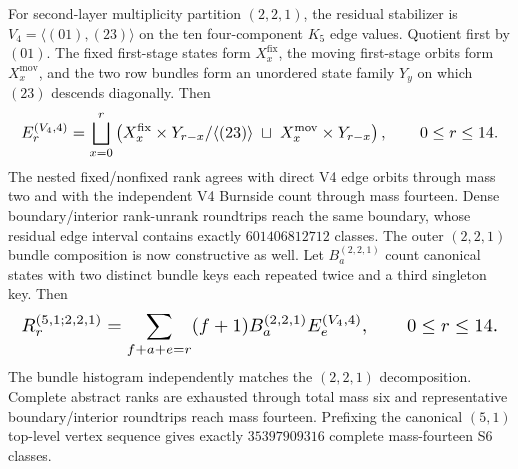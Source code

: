 \documentclass{article}
\newcommand{\fitmath}[1]{\resizebox{0.99\linewidth}{!}{$\displaystyle #1$}}
\begin{document}
For second-layer multiplicity partition $(2,2,1)$, the residual stabilizer is
$V_4=\langle(01),(23)\rangle$ on the ten four-component $K_5$ edge values.
Quotient first by $(01)$. The fixed first-stage states form
$X_x^{\mathrm{fix}}$,
the moving first-stage orbits form $X_x^{\mathrm{mov}}$, and the two row bundles
form an unordered state family $Y_y$ on which $(23)$ descends diagonally. Then
\begin{equation}
  \fitmath{%
    E_r^{(V_4,4)}=
      \bigsqcup_{x=0}^{r}\left(
        X_x^{\mathrm{fix}}\times Y_{r-x}/\langle(23)\rangle
        \;\sqcup\;
        X_x^{\mathrm{mov}}\times Y_{r-x}
      \right),
    \qquad 0\leq r\leq14.
  }
  \label{eq:optimization-crazy-sextuple-s6-s5-v4-edge-ranking}
\end{equation}
The nested fixed/nonfixed rank agrees with direct V4 edge orbits through mass
two and with the independent V4 Burnside count through mass fourteen. Dense
boundary/interior rank-unrank roundtrips reach the same boundary, whose residual
edge interval contains exactly $601406812712$ classes. The outer $(2,2,1)$
bundle composition is now constructive as well. Let $B_a^{(2,2,1)}$ count
canonical states with two distinct bundle keys each repeated twice and a third
singleton key. Then
\begin{equation}
  \fitmath{%
    R_r^{(5,1;2,2,1)}=
      \sum_{f+a+e=r}(f+1)B_a^{(2,2,1)}E_e^{(V_4,4)},
    \qquad 0\leq r\leq14.
  }
  \label{eq:optimization-crazy-sextuple-s6-s5-v4-bundle-ranking}
\end{equation}
The bundle histogram independently matches the $(2,2,1)$ decomposition.
Complete abstract ranks are exhausted through total mass six and representative
boundary/interior roundtrips reach mass fourteen. Prefixing the canonical
$(5,1)$ top-level vertex sequence gives exactly $35397909316$ complete
mass-fourteen S6 classes.
\end{document}
